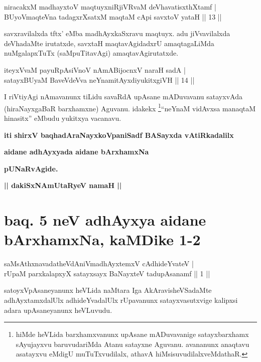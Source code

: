 \begin{shl}
niracakxM madhayxtoV maqtuyxniRjiVRvaM deVhavatisxthXtamf | \\
BUyoV\s maqteVna tadagxrXsatxM maqtaM cApi savxtoV yataH \hfill ||  13 || 
\end{shl}

\begin{artha}
savxravilalxda tftx' eMba madhAyxkaSxravu maqtuyx. adu jiVvavilalxda deVhadaMte irutatxde, savxtaH maqtavAgidadxrU amaqtagaLiMda nuMgalapxTuTx (saMpuTitavAgi) amaqtavAgirutatxde.
\end{artha}

\begin{shl}
iteyxVvaM payuRpAsiVnoV nAmABijocnxV naraH sadA | \\
satayxBUyaM BaveVdeVva neYnamitAyxdiyukitxgiVH \hfill ||  14 || 
\end{shl}

\begin{artha}
I riVtiyAgi nAmavanunx tiLidu savaRdA upAsane mADuvavanu satayxvAda (hiraNayxgaBaR barxhamxne) Aguvanu. idakekx \footnote{hiMde heVLida barxhamxvanunx upAsane mADuvavanige satayxbarxhamx sAyujayxvu baruvudariMda Atanu satayxne Aguvanu. avananunx anaqtavu asatayxvu eMdigU muTuTxvudilalx, athavA hiMsisuvudilalxveMdathaR.}``neYnaM vidAvxsa manaqtaM hinasitx'' eMbudu yukitxya vacanavu.
\end{artha}

\begin{center}
{\bf iti shirxV baqhadAraNayxkoVpaniSadf BASayxda vAtiRkadalilx}
\smallskip

{\bf aidane adhAyxyada aidane bArxhamxNa}
\smallskip

{\bf pUNaRvAgide.}

\smallskip
{\bf || dakiSxNAmUtaRyeV namaH ||}
\end{center}

\section*{baq. 5 neV adhAyxya aidane bArxhamxNa, kaMDike 1-2}

\begin{shl}
saMsAthxnavadatheVdAniVmadhAyxtemxV cAdhideYvateV | \\
rUpaM parxkalapxyX satayxsayx BaNayxteV  tadupAsanamf \hfill ||  1 || 
\end{shl}

\begin{artha}
satoyxVpAsaneyanunx heVLida naMtara Iga AkAravisheVSadaMte adhAyxtamxdalUlx adhideYvadalUlx rUpavanunx satayxvasutxvige kalipxsi adara upAsaneyanunx heVLuvudu.
\end{artha}

